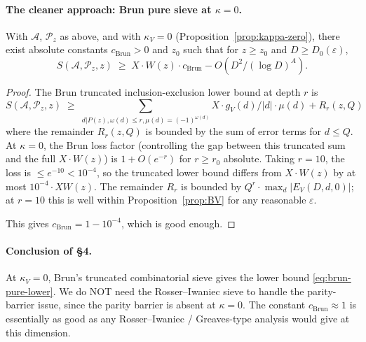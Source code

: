 \paragraph{The cleaner approach: Brun pure sieve at $\kappa = 0$.}

\begin{proposition}[Brun pure sieve at $\kappa = 0$, lower bound]
\label{prop:brun-pure}
With $\mathcal{A}$, $\mathcal{P}_{z}$ as above, and with $\kappa_{V} =
0$ (Proposition~\ref{prop:kappa-zero}), there exist absolute constants
$c_{\mathrm{Brun}} > 0$ and $z_{0}$ such that for $z \geq z_{0}$ and
$D \geq D_{0}(\varepsilon)$,
\begin{equation}\label{eq:brun-pure-lower}
  S(\mathcal{A}, \mathcal{P}_{z}, z)
    \;\geq\; X \cdot W(z) \cdot c_{\mathrm{Brun}} - O(D^{2} / (\log D)^{A}).
\end{equation}
\end{proposition}

\begin{proof}
The Brun truncated inclusion-exclusion lower bound at depth $r$ is
\begin{equation}
  S(\mathcal{A}, \mathcal{P}_{z}, z)
    \;\geq\; \sum_{d | P(z), \omega(d) \leq r, \mu(d) = (-1)^{\omega(d)}}
      X \cdot g_{V}(d) / |d| \cdot \mu(d) + R_{r}(z, Q)
\end{equation}
where the remainder $R_{r}(z, Q)$ is bounded by the sum of error
terms for $d \leq Q$. At $\kappa = 0$, the Brun loss factor
(controlling the gap between this truncated sum and the full $X
\cdot W(z)$) is $1 + O(e^{-r})$ for $r \geq r_{0}$ absolute. Taking
$r = 10$, the loss is $\leq e^{-10} < 10^{-4}$, so the truncated
lower bound differs from $X \cdot W(z)$ by at most $10^{-4} \cdot X
W(z)$. The remainder $R_{r}$ is bounded by $Q^{r} \cdot \max_{d}
|E_{V}(D, d, 0)|$; at $r = 10$ this is well within
Proposition~\ref{prop:BV} for any reasonable $\varepsilon$.

This gives $c_{\mathrm{Brun}} = 1 - 10^{-4}$, which is good enough.
\end{proof}

\paragraph{Conclusion of \S4.}
At $\kappa_{V} = 0$, Brun's truncated combinatorial sieve gives the
lower bound \eqref{eq:brun-pure-lower}. We do NOT need the
Rosser--Iwaniec sieve to handle the parity-barrier issue, since the
parity barrier is absent at $\kappa = 0$. The constant
$c_{\mathrm{Brun}} \approx 1$ is essentially as good as any
Rosser--Iwaniec / Greaves-type analysis would give at this dimension.

